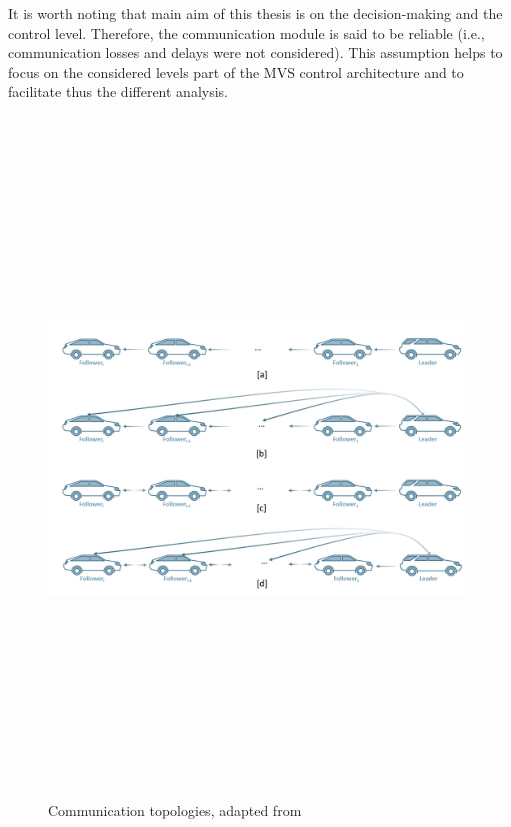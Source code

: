 It is worth noting that main aim of this thesis is on the decision-making and the control level. Therefore, the communication module is said to be reliable (i.e., communication losses and delays were not considered). This assumption helps to focus on the considered levels part of the MVS control architecture and to facilitate thus the different analysis. 
\begin{figure}[!h]
        \centering 
        \includegraphics[width=11cm,height=18cm,keepaspectratio]{chapters/Chapitre_3/Figures/communication_topologies (1).png}
        \caption{Communication topologies, adapted from \cite{ren2008distributed}}
        \label{fig:Communication topologies}
        \end{figure}















